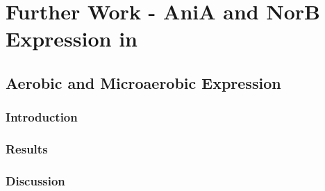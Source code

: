 \chapter{Further Work - AniA and NorB Expression in \Nm{}}
\label{chap:expression}
\section{Aerobic and Microaerobic Expression}
\subsection{Introduction}
\subsection{Results}
\subsection{Discussion}